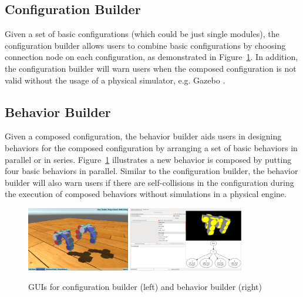 \documentclass[graybox]{svmult}
\begin{document}
\subsection{Configuration Builder}
Given a set of basic configurations (which could be just single modules), the configuration builder allows users to combine basic configurations by choosing connection node on each configuration, as demonstrated in Figure~\ref{fig:smores_conf}. In addition, the configuration builder will warn users when the composed configuration is not valid without the usage of a physical simulator, e.g. Gazebo
\cite{koenig2004design}.

\subsection{Behavior Builder}
Given a composed configuration, the behavior builder aids users in designing behaviors for the composed configuration by arranging a set of basic behaviors in parallel or in series. Figure~\ref{fig:smores_conf} illustrates a new behavior is composed by putting four basic behaviors in parallel. Similar to the configuration builder, the behavior builder will also warn users if there are self-collisions in the configuration during the execution of composed behaviors without simulations in a physical engine.

\begin{figure}
\begin{center}
    \includegraphics[height=1.1in]{images/library/unity/config_designer.png}
    \includegraphics[height=1.1in]{images/gait_window.png}
    \caption{GUIs for configuration builder (left) and behavior builder (right)}
    \label{fig:smores_conf}
\end{center}
\end{figure}
\end{document}
